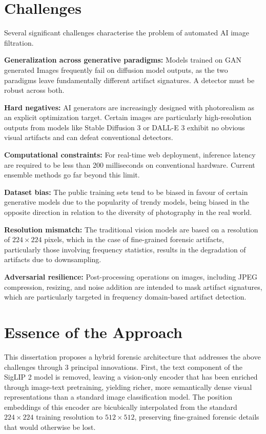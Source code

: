 \section{Challenges}

Several significant challenges characterise the problem of automated AI image filtration.

\textbf{Generalization across generative paradigms:} Models trained on GAN generated Images frequently fail on diffusion model outputs, as the two paradigms leave fundamentally different artifact signatures. A detector must be robust across both.

\textbf{Hard negatives:} AI generators are increasingly designed with photorealism as an explicit optimization target. Certain images are particularly high-resolution outputs from models like Stable Diffusion 3 or DALL-E 3 exhibit no obvious visual artifacts and can defeat conventional detectors.

\textbf{Computational constraints:} For real-time web deployment, inference latency are required to be less than 200 milliseconds on conventional hardware. Current ensemble methods go far beyond this limit.

\textbf{Dataset bias:} The public training sets tend to be biased in favour of certain generative models due to the popularity of trendy models, being biased in the opposite direction in relation to the diversity of photography in the real world.

\textbf{Resolution mismatch:} The traditional vision models are based on a resolution of $224 \times 224$ pixels, which in the case of fine-grained forensic artifacts, particularly those involving frequency statistics, results in the degradation of artifacts due to downsampling.

\textbf{Adversarial resilience:} Post-processing operations on images, including JPEG compression, resizing, and noise addition are intended to mask artifact signatures, which are particularly targeted in frequency domain-based artifact detection.

\section{Essence of the Approach}

This dissertation proposes a hybrid forensic architecture that addresses the above challenges through 3 principal innovations. First, the text component of the SigLIP 2 model \cite{tschannen2025siglip2} is removed, leaving a vision-only encoder that has been enriched through image-text pretraining, yielding richer, more semantically dense visual representations than a standard image classification model. The position embeddings of this encoder are bicubically interpolated from the standard $224 \times 224$ training resolution to $512 \times 512$, preserving fine-grained forensic details that would otherwise be lost.

